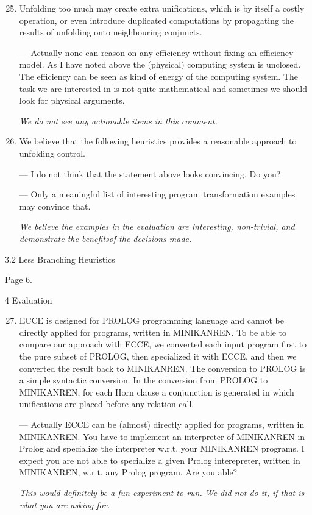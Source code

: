 \begin{enumerate}
  \setcounter{enumi}{24}
  \item {Unfolding too much may create extra unifications, which is by itself a costly operation, or even introduce duplicated computations by propagating the results of unfolding onto neighbouring conjuncts.

  --- Actually none can reason on any efficiency without fixing an efficiency model. As I have noted above the (physical) computing system is unclosed. The efficiency can be seen as kind of energy of the computing system. The task we are interested in is not quite mathematical and sometimes we should look for physical arguments.

  \emph{We do not see any actionable items in this comment.}
  }

  \item {
    We believe that the following heuristics provides a reasonable approach to unfolding control.

 --- I do not think that the statement above looks convincing. Do you?

 --- Only a meaningful list of interesting program transformation examples may convince that.

 \emph{We believe the examples in the evaluation are interesting, non-trivial, and demonstrate the benefitsof the decisions made.}
  }
\end{enumerate}

3.2 Less Branching Heuristics

Page 6.

4 Evaluation

\begin{enumerate}
  \setcounter{enumi}{26}
  \item {
    ECCE is designed for PROLOG programming language and cannot be directly applied for programs, written in MINIKANREN. To be able to compare our approach with ECCE, we converted each input program first to the pure subset of PROLOG, then specialized it with ECCE, and then we converted the result back to MINIKANREN. The conversion to PROLOG is a simple syntactic conversion. In the conversion from PROLOG to MINIKANREN, for each Horn clause a conjunction is generated in which unifications are placed before any relation call.

    --- Actually ECCE can be (almost) directly applied for programs, written in MINIKANREN. You have to implement an interpreter of MINIKANREN in Prolog and specialize the interpreter w.r.t. your MINIKANREN programs. I expect you are not able to specialize a given Prolog interepreter, written in MINIKANREN,  w.r.t. any Prolog program. Are you able?

    \emph{This would definitely be a fun experiment to run. We did not do it, if that is what you are asking for.}
  }
\end{enumerate}

